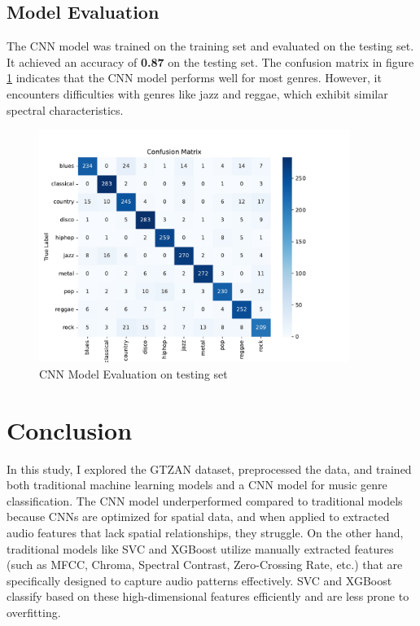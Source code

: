 \documentclass[11.5pt]{article}
\begin{document}
\subsection{Model Evaluation}
The CNN model was trained on the training set and evaluated on the testing set. It achieved an accuracy of \textbf{0.87} on the testing set. The confusion matrix in figure \ref{fig:cnn_evaluation} indicates that the CNN model performs well for most genres. However, it encounters difficulties with genres like jazz and reggae, which exhibit similar spectral characteristics.
\begin{figure}[H]
    \centering
    \includegraphics[width=0.9\textwidth]{graphics/cnn_evaluation.pdf}
    \caption{CNN Model Evaluation on testing set}
    \label{fig:cnn_evaluation}
\end{figure}

\section{Conclusion} \label{sec:conclusion}
In this study, I explored the GTZAN dataset, preprocessed the data, and trained both traditional machine learning models and a CNN model for music genre classification. The CNN model underperformed compared to traditional models because CNNs are optimized for spatial data, and when applied to extracted audio features that lack spatial relationships, they struggle. On the other hand, traditional models like SVC and XGBoost utilize manually extracted features (such as MFCC, Chroma, Spectral Contrast, Zero-Crossing Rate, etc.) that are specifically designed to capture audio patterns effectively. SVC and XGBoost classify based on these high-dimensional features efficiently and are less prone to overfitting.
\end{document}
